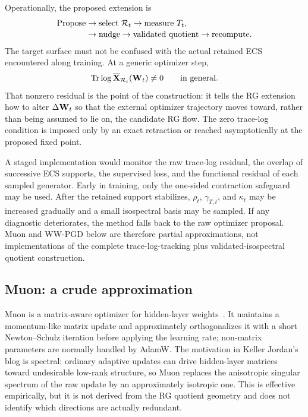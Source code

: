 Operationally, the proposed extension is
\begin{equation}
\begin{aligned}
  \text{Propose}
  &\rightarrow \text{select }\mathcal R_t
  \rightarrow \text{measure }T_t,\\[-0.15em]
  &\rightarrow \text{nudge}
  \rightarrow \text{validated quotient}
  \rightarrow \text{recompute}.
\end{aligned}
  \label{eq:optimizer_pipeline}
\end{equation}
The target surface must not be confused with the actual retained ECS encountered along training.  At a generic optimizer step,
\begin{equation}
  \operatorname{Tr}\log\overline{\mathbf X}_{\mathcal R_t}(\mathbf W_t)\neq0
  \qquad\text{in general}.
  \label{eq:actual_ecs_off_gauge}
\end{equation}
That nonzero residual is the point of the construction: it tells the RG extension how to alter $\Delta\mathbf W_t$ so that the external optimizer trajectory moves toward, rather than being assumed to lie on, the candidate RG flow.  The zero trace-log condition is imposed only by an exact retraction or reached asymptotically at the proposed fixed point.

A staged implementation would monitor the raw trace-log residual, the overlap of successive ECS supports, the supervised loss, and the functional residual of each sampled generator.  Early in training, only the one-sided contraction safeguard may be used.  After the retained support stabilizes, $\rho_t$, $\gamma_{T,t}$, and $\kappa_t$ may be increased gradually and a small isospectral basis may be sampled.  If any diagnostic deteriorates, the method falls back to the raw optimizer proposal.  Muon and WW-PGD below are therefore partial approximations, not implementations of the complete trace-log-tracking plus validated-isospectral quotient construction.

\newpage
\subsection{Muon: a crude approximation}
\label{sxn:muon_method}

Muon is a matrix-aware optimizer for hidden-layer weights~\cite{JordanMuon2024,JordanBlog,LiuMuonScalable2025}.  It maintains a momentum-like matrix update and approximately orthogonalizes it with a short Newton--Schulz iteration before applying the learning rate; non-matrix parameters are normally handled by AdamW.  The motivation in Keller Jordan's blog is spectral: ordinary adaptive updates can drive hidden-layer matrices toward undesirable low-rank structure, so Muon replaces the anisotropic singular spectrum of the raw update by an approximately isotropic one.  This is effective empirically, but it is not derived from the RG quotient geometry and does not identify which directions are actually redundant.

